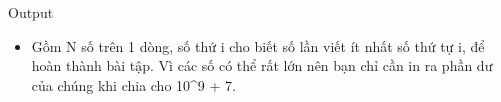 Output
\begin{itemize}
	\item     Gồm N số trên 1 dòng, số thứ i cho biết số lần viết        ít nhất    số thứ tự i,    để hoàn thành bài tập. Vì các số có thể rất lớn nên bạn chỉ cần in ra phần dư của chúng khi chia cho 10^9 + 7.   
\end{itemize}